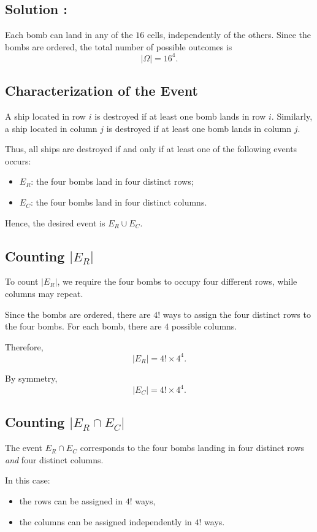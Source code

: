 \subsection*{Solution :}

Each bomb can land in any of the $16$ cells, independently of the others. Since the bombs are ordered, the total number of possible outcomes is
\[
|\Omega| = 16^4.
\]

\subsection*{Characterization of the Event}

A ship located in row $i$ is destroyed if at least one bomb lands in row $i$.  
Similarly, a ship located in column $j$ is destroyed if at least one bomb lands in column $j$.

Thus, all ships are destroyed if and only if at least one of the following events occurs:
\begin{itemize}
    \item $E_R$: the four bombs land in four distinct rows;
    \item $E_C$: the four bombs land in four distinct columns.
\end{itemize}

Hence, the desired event is $E_R \cup E_C$.

\subsection*{Counting $|E_R|$}

To count $|E_R|$, we require the four bombs to occupy four different rows, while columns may repeat.

Since the bombs are ordered, there are $4!$ ways to assign the four distinct rows to the four bombs.  
For each bomb, there are $4$ possible columns.

Therefore,
\[
|E_R| = 4! \times 4^4.
\]

By symmetry,
\[
|E_C| = 4! \times 4^4.
\]

\subsection*{Counting $|E_R \cap E_C|$}

The event $E_R \cap E_C$ corresponds to the four bombs landing in four distinct rows \emph{and} four distinct columns.

In this case:
\begin{itemize}
    \item the rows can be assigned in $4!$ ways,
    \item the columns can be assigned independently in $4!$ ways.
\end{itemize}

